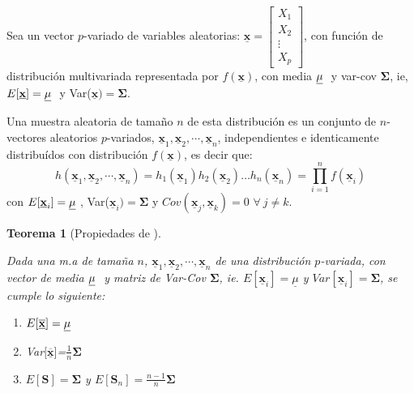 \documentclass[
]{book}
\newtheorem{theorem}{Teorema}[chapter]
\theoremstyle{definition}
\theoremstyle{definition}
\theoremstyle{definition}
\theoremstyle{definition}
\theoremstyle{remark}
\begin{document}
Sea un vector \(p\)-variado de variables aleatorias: \(\underline{\mathbf{x}}=\begin{bmatrix}
X_1 \\ X_2 \\ \vdots \\ X_p
\end{bmatrix}\),
con función de distribución multivariada representada por \(f(\underline{\mathbf{x}})\), con media \(
{\large \underline{\mathbf{\mu}}}\ \) y var-cov \(\mathbf{\Sigma}\), ie, \(E[\underline{\mathbf{x}}]=
{\large \underline{\mathbf{\mu}}}\ \) y Var(\(\underline{\mathbf{x}})=\mathbf{\Sigma}\).

Una muestra aleatoria de tamaño \(n\) de esta distribución es un conjunto de \(n\)-vectores aleatorios \(p\)-variados, \(\underline{\mathbf{x}}_1,\underline{\mathbf{x}}_2,\cdots,\underline{\mathbf{x}}_n\), independientes e identicamente distribuídos con distribución
\(f(\underline{\mathbf{x}})\), es decir que:
\[
h(\underline{\mathbf{x}}_1,\underline{\mathbf{x}}_2,\cdots,\underline{\mathbf{x}}_n)=h_1(\underline{\mathbf{x}}_1)
h_2(\underline{\mathbf{x}}_2)\ldots h_n(\underline{\mathbf{x}}_n)=\prod_{i=1}^n f(\underline{\mathbf{x}}_i)
\]
con \(E[\underline{\mathbf{x}}_i]=
{\large \underline{\mathbf{\mu}}}\ \), Var(\(\underline{\mathbf{x}}_i)=\mathbf{\Sigma}\) y \(Cov(\underline{\mathbf{x}}_j, \underline{\mathbf{x}}_k)=0\) \(\forall\ j\neq k\).

\begin{theorem}[Propiedades de ]
\protect\hypertarget{thm:teorema-propxbarra}{}\label{thm:teorema-propxbarra}

Dada una m.a de tamaña \(n\), \(\underline{\mathbf{x}}_1,\underline{\mathbf{x}}_2,\cdots,\underline{\mathbf{x}}_n\) de una distribución \(p\)-variada, con vector de media \(
{\large \underline{\mathbf{\mu}}}\ \) y matriz de Var-Cov \(\mathbf{\Sigma}\), ie. \(E[\underline{\mathbf{x}}_i]=\underline{\mu}\) y \(Var[\underline{\mathbf{x}}_i]=\mathbf{\Sigma}\), se cumple lo siguiente:

\begin{enumerate}
\def\labelenumi{\arabic{enumi}.}
\item
  \(E[\underline{\overline{\mathbf{x}}}]=
  {\large \underline{\mathbf{\mu}}}\ \)
\item
  Var\(\bigl[\underline{\overline{\mathbf{x}}}\bigr]\)=\(\frac{1}{n}\mathbf{\Sigma}\)
\item
  \(E[\mathbf{S}]=\mathbf{\Sigma}\) y \(E[\mathbf{S}_n]=\frac{n-1}{n}\mathbf{\Sigma}\)
\end{enumerate}

\end{theorem}
\end{document}
